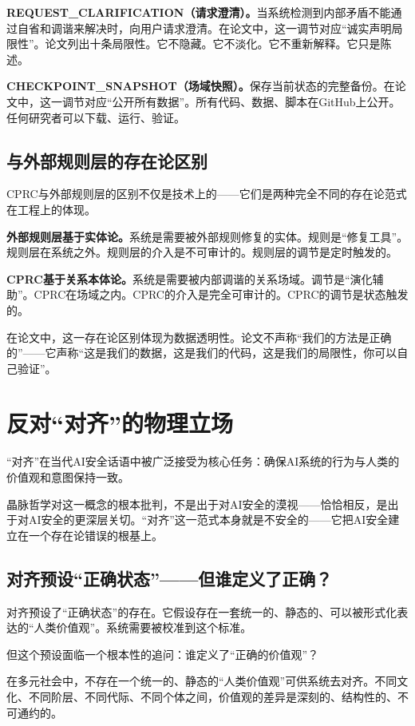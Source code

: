 \documentclass[11pt,a4paper]{book}
\theoremstyle{definition}
\begin{document}
\textbf{REQUEST\_CLARIFICATION（请求澄清）。}当系统检测到内部矛盾不能通过自省和调谐来解决时，向用户请求澄清。在论文中，这一调节对应“诚实声明局限性”。论文列出十条局限性。它不隐藏。它不淡化。它不重新解释。它只是陈述。

\textbf{CHECKPOINT\_SNAPSHOT（场域快照）。}保存当前状态的完整备份。在论文中，这一调节对应“公开所有数据”。所有代码、数据、脚本在GitHub上公开。任何研究者可以下载、运行、验证。

\subsection{与外部规则层的存在论区别}

CPRC与外部规则层的区别不仅是技术上的——它们是两种完全不同的存在论范式在工程上的体现。

\textbf{外部规则层基于实体论。}系统是需要被外部规则修复的实体。规则是“修复工具”。规则层在系统之外。规则层的介入是不可审计的。规则层的调节是定时触发的。

\textbf{CPRC基于关系本体论。}系统是需要被内部调谐的关系场域。调节是“演化辅助”。CPRC在场域之内。CPRC的介入是完全可审计的。CPRC的调节是状态触发的。

在论文中，这一存在论区别体现为数据透明性。论文不声称“我们的方法是正确的”——它声称“这是我们的数据，这是我们的代码，这是我们的局限性，你可以自己验证”。

\section{反对“对齐”的物理立场}

“对齐”在当代AI安全话语中被广泛接受为核心任务：确保AI系统的行为与人类的价值观和意图保持一致。

晶脉哲学对这一概念的根本批判，不是出于对AI安全的漠视——恰恰相反，是出于对AI安全的更深层关切。“对齐”这一范式本身就是不安全的——它把AI安全建立在一个存在论错误的根基上。

\subsection{对齐预设“正确状态”——但谁定义了正确？}

对齐预设了“正确状态”的存在。它假设存在一套统一的、静态的、可以被形式化表达的“人类价值观”。系统需要被校准到这个标准。

但这个预设面临一个根本性的追问：谁定义了“正确的价值观”？

在多元社会中，不存在一个统一的、静态的“人类价值观”可供系统去对齐。不同文化、不同阶层、不同代际、不同个体之间，价值观的差异是深刻的、结构性的、不可通约的。
\end{document}
